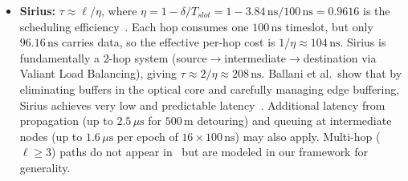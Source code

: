\documentclass{article}
\begin{document}
\begin{itemize}
        \item \textbf{Sirius:} $\tau \approx \ell / \eta$, where $\eta = 1 - \delta/T_{slot} = 1 - 3.84\,\text{ns}/100\,\text{ns} = 0.9616$ is the scheduling efficiency~\cite{sirius}. Each hop consumes one $100\,\text{ns}$ timeslot, but only $96.16\,\text{ns}$ carries data, so the effective per-hop cost is $1/\eta \approx 104\,\text{ns}$. Sirius is fundamentally a 2-hop system (source$\to$intermediate$\to$destination via Valiant Load Balancing), giving $\tau \approx 2/\eta \approx 208\,\text{ns}$. Ballani et al.\ show that by eliminating buffers in the optical core and carefully managing edge buffering, Sirius achieves very low and predictable latency~\cite{sirius}. Additional latency from propagation (up to $2.5\,\mu\text{s}$ for $500\,\text{m}$ detouring) and queuing at intermediate nodes (up to $1.6\,\mu\text{s}$ per epoch of $16 \times 100\,\text{ns}$) may also apply. Multi-hop ($\ell \geq 3$) paths do not appear in~\cite{sirius} but are modeled in our framework for generality.
    \end{itemize}
\end{document}
